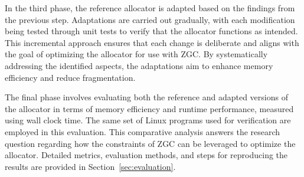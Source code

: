 In the third phase, the reference allocator is adapted based on the findings from the previous step. Adaptations are carried out gradually, with each modification being tested through unit tests to verify that the allocator functions as intended. This incremental approach ensures that each change is deliberate and aligns with the goal of optimizing the allocator for use with ZGC. By systematically addressing the identified aspects, the adaptations aim to enhance memory efficiency and reduce fragmentation.

The final phase involves evaluating both the reference and adapted versions of the allocator in terms of memory efficiency and runtime performance, measured using wall clock time. The same set of Linux programs used for verification are employed in this evaluation. This comparative analysis answers the research question regarding how the constraints of ZGC can be leveraged to optimize the allocator. Detailed metrics, evaluation methods, and steps for reproducing the results are provided in Section~\ref{sec:evaluation}.

